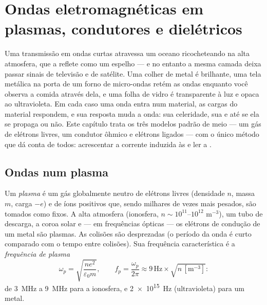 \chapter{Ondas eletromagnéticas em plasmas, condutores e dielétricos}\label{ch:b2:waves-in-media}

Uma transmissão em ondas curtas atravessa um oceano ricocheteando na alta
atmosfera, que a reflete como um espelho --- e no entanto a mesma camada deixa
passar sinais de televisão e de satélite. Uma colher de metal é brilhante, uma
tela metálica na porta de um forno de micro-ondas retém as ondas enquanto
você observa a comida através dela, e uma folha de vidro é transparente
à luz e opaca ao ultravioleta. Em cada caso uma onda entra num
material, as cargas do material respondem, e sua resposta muda
a onda: sua celeridade, sua  e até se ela se propaga ou
não. Este capítulo trata os três modelos padrão de meio --- um
gás de elétrons livres, um condutor ôhmico e elétrons ligados --- com
o único método que dá conta de todos: acrescentar a corrente induzida às
 e ler a .

\section{Ondas num plasma}

\begin{definition}\label{def:b2:waves-in-media:plasma}
Um \emph{plasma} é um gás globalmente neutro de elétrons livres (densidade
$n$, massa $m$, carga $-e$) e de íons positivos que, sendo milhares de
vezes mais pesados, são tomados como fixos. A alta atmosfera (ionosfera,
$n \sim 10^{11}$--$10^{12}$ m$^{-3}$), um tubo de descarga, a coroa solar
e --- em frequências ópticas --- os elétrons de condução de um metal
são plasmas. As colisões são desprezadas (o período da onda é curto
comparado com o tempo entre colisões). Sua frequência
característica é a \emph{frequência de plasma}
\[
\omega_p = \sqrt{\frac{ne^2}{\varepsilon_0m}} , \qquad
f_p = \frac{\omega_p}{2\pi} \approx 9\,\text{Hz}\times\sqrt{n\,[\text{m}^{-3}]} :
\]
de \qty{3}{MHz} a \qty{9}{MHz} para a ionosfera, e \qty{2e15}{Hz} (ultravioleta) para
um metal.
\end{definition}

